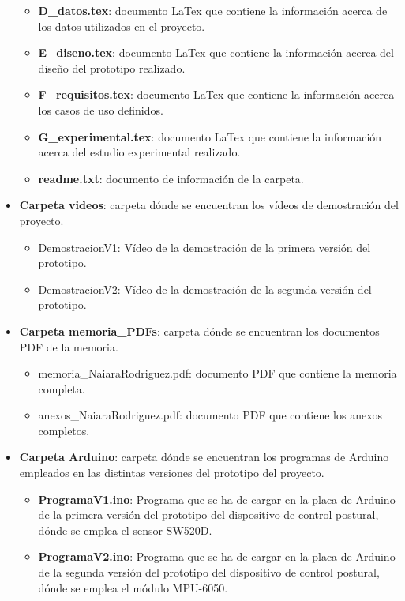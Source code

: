 \begin{itemize}
\begin{itemize}
        \item \textbf{D\_datos.tex}: documento LaTex que contiene la información acerca de los datos utilizados en el proyecto.
        \item \textbf{E\_diseno.tex}: documento LaTex que contiene la información acerca del diseño del prototipo realizado.
        \item \textbf{F\_requisitos.tex}: documento LaTex que contiene la información acerca los casos de uso definidos.
        \item \textbf{G\_experimental.tex}: documento LaTex que contiene la información acerca del estudio experimental realizado.
        \item \textbf{readme.txt}: documento de información de la carpeta.
    \end{itemize}
    \item \textbf{Carpeta videos}: carpeta dónde se encuentran los vídeos de demostración del proyecto.
    \begin{itemize}
        \item DemostracionV1:  Vídeo de la demostración de la primera versión del prototipo.
        \item DemostracionV2: Vídeo de la demostración de la segunda versión del prototipo.
    \end{itemize}
    \item \textbf{Carpeta memoria_PDFs}: carpeta dónde se encuentran los documentos PDF de la memoria.
    \begin{itemize}
        \item memoria\_NaiaraRodriguez.pdf:  documento PDF que contiene la memoria completa.
        \item anexos\_NaiaraRodriguez.pdf: documento PDF que contiene los anexos completos.
    \end{itemize}
    
    \item \textbf{Carpeta Arduino}: carpeta dónde se encuentran los programas de Arduino\cite{ArduinoIDE} empleados en las distintas versiones del prototipo del proyecto.
    \begin{itemize}
        \item \textbf{ProgramaV1.ino}: Programa que se ha de cargar en la placa de Arduino de la primera versión del prototipo del dispositivo de control postural, dónde se emplea el sensor SW520D.
        \item \textbf{ProgramaV2.ino}: Programa que se ha de cargar en la placa de Arduino de la segunda versión del prototipo del dispositivo de control postural, dónde se emplea el módulo MPU-6050.
    \end{itemize}
    

\end{itemize}
